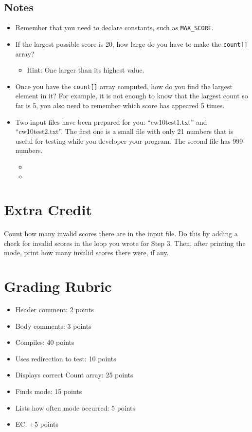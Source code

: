 \documentclass[letter,11pt]{article}
\begin{document}
\subsection*{Notes}
\begin{itemize}
    \item Remember that you need to declare constants, such as \texttt{MAX\_SCORE}.
    \item If the largest possible score is 20, how large do you have to make the \texttt{count[]} array?
    \begin{itemize}
        \item Hint: One larger than its highest value.
    \end{itemize}
    \item Once you have the \texttt{count[]} array computed, how do you find the largest element in it? For example, it is not enough to know that the largest count so far is 5, you also need to remember which score has appeared 5 times.
    \item Two input files have been prepared for you: ``cw10test1.txt'' and ``cw10test2.txt''. The first one is a small file with only 21 numbers that is useful for testing while you developer your program. The second file has 999 numbers.
    \begin{itemize}
        \item {}
        \item {}
    \end{itemize}
\end{itemize}

\section*{Extra Credit}
\paragraph{}Count how many invalid scores there are in the input file. Do this by adding a check for invalid scores in the loop you wrote for Step 3. Then, after printing the mode, print how many invalid scores there were, if any.

\section*{Grading Rubric}
\begin{itemize}
    \item Header comment: 2 points
    \item Body comments: 3 points
    \item Compiles: 40 points
    \item Uses redirection to test: 10 points
    \item Displays correct Count array: 25 points
    \item Finds mode: 15 points
    \item Lists how often mode occurred: 5 points
    \item EC: +5 points
\end{itemize}
\end{document}
